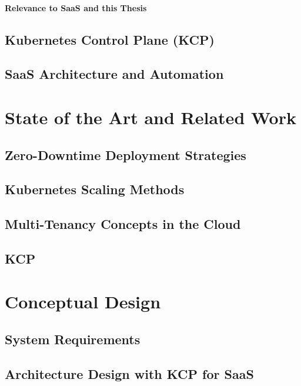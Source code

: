 \documentclass[11pt, a4paper, oneside, draft]{scrartcl}
\begin{document}
            \paragraph{Relevance to SaaS and this Thesis}

        \subsection{Kubernetes Control Plane (KCP)}

        \subsection{SaaS Architecture and Automation}

    \section{State of the Art and Related Work}

        \subsection{Zero-Downtime Deployment Strategies}

        \subsection{Kubernetes Scaling Methods}

        \subsection{Multi-Tenancy Concepts in the Cloud}

        \subsection{KCP}

    \section{Conceptual Design}

        \subsection{System Requirements}

        \subsection{Architecture Design with KCP for SaaS}
\end{document}
